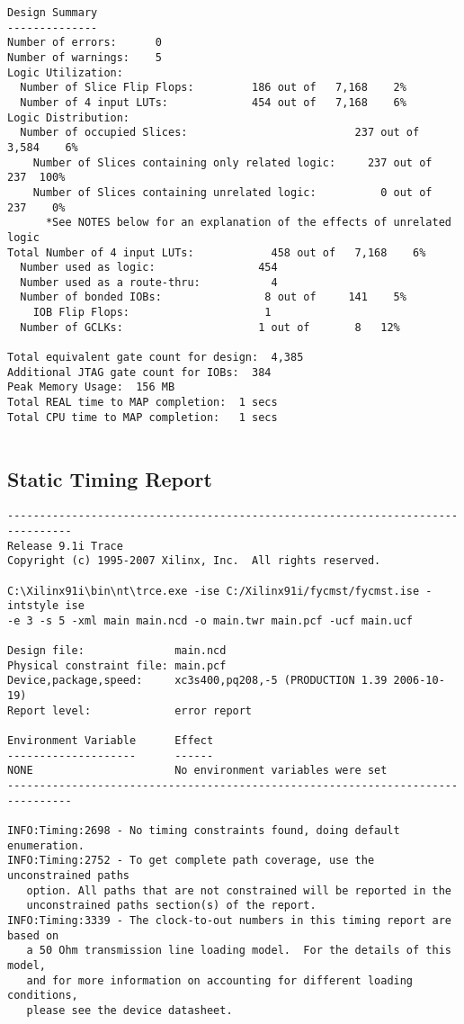 \documentclass[14pt]{report}
\begin{document}
{\begin{verbatim}
Design Summary
--------------
Number of errors:      0
Number of warnings:    5
Logic Utilization:
  Number of Slice Flip Flops:         186 out of   7,168    2%
  Number of 4 input LUTs:             454 out of   7,168    6%
Logic Distribution:
  Number of occupied Slices:                          237 out of   3,584    6%
    Number of Slices containing only related logic:     237 out of     237  100%
    Number of Slices containing unrelated logic:          0 out of     237    0%
      *See NOTES below for an explanation of the effects of unrelated logic
Total Number of 4 input LUTs:            458 out of   7,168    6%
  Number used as logic:                454
  Number used as a route-thru:           4
  Number of bonded IOBs:                8 out of     141    5%
    IOB Flip Flops:                     1
  Number of GCLKs:                     1 out of       8   12%

Total equivalent gate count for design:  4,385
Additional JTAG gate count for IOBs:  384
Peak Memory Usage:  156 MB
Total REAL time to MAP completion:  1 secs 
Total CPU time to MAP completion:   1 secs 


\end{verbatim}
\subsection*{Static Timing Report}
\begin{verbatim}
--------------------------------------------------------------------------------
Release 9.1i Trace 
Copyright (c) 1995-2007 Xilinx, Inc.  All rights reserved.

C:\Xilinx91i\bin\nt\trce.exe -ise C:/Xilinx91i/fycmst/fycmst.ise -intstyle ise
-e 3 -s 5 -xml main main.ncd -o main.twr main.pcf -ucf main.ucf

Design file:              main.ncd
Physical constraint file: main.pcf
Device,package,speed:     xc3s400,pq208,-5 (PRODUCTION 1.39 2006-10-19)
Report level:             error report

Environment Variable      Effect 
--------------------      ------ 
NONE                      No environment variables were set
--------------------------------------------------------------------------------

INFO:Timing:2698 - No timing constraints found, doing default enumeration.
INFO:Timing:2752 - To get complete path coverage, use the unconstrained paths 
   option. All paths that are not constrained will be reported in the 
   unconstrained paths section(s) of the report.
INFO:Timing:3339 - The clock-to-out numbers in this timing report are based on 
   a 50 Ohm transmission line loading model.  For the details of this model, 
   and for more information on accounting for different loading conditions, 
   please see the device datasheet.




\end{verbatim}}
\end{document}
